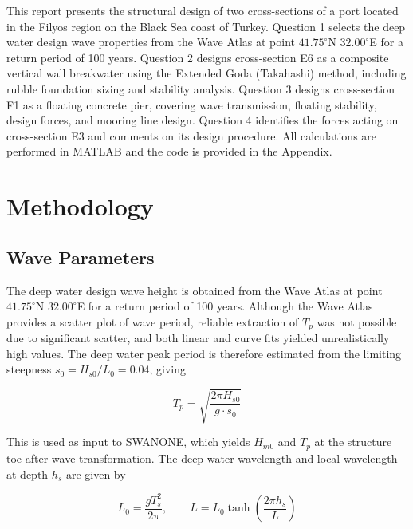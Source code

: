 \documentclass[a4paper, 11pt]{article}
\begin{document}
\hspace*{0.5cm}This report presents the structural design of two cross-sections of a port located in the Filyos region on the Black Sea coast of Turkey. Question 1 selects the deep water design wave properties from the Wave Atlas at point $41.75^{\circ}$N $32.00^{\circ}$E for a return period of 100 years. Question 2 designs cross-section E6 as a composite vertical wall breakwater using the Extended Goda (Takahashi) method, including rubble foundation sizing and stability analysis. Question 3 designs cross-section F1 as a floating concrete pier, covering wave transmission, floating stability, design forces, and mooring line design. Question 4 identifies the forces acting on cross-section E3 and comments on its design procedure. All calculations are performed in MATLAB and the code is provided in the Appendix.

\section{Methodology}

\subsection{Wave Parameters}

\hspace*{0.5cm} The deep water design wave height is obtained from the Wave Atlas at point $41.75^{\circ}$N $32.00^{\circ}$E for a return period of 100 years. Although the Wave Atlas provides a scatter plot of wave period, reliable extraction of $T_p$ was not possible due to significant scatter, and both linear and curve fits yielded unrealistically high values. The deep water peak period is therefore estimated from the limiting steepness $s_0 = H_{s0}/L_0 = 0.04$, giving

\begin{equation}
    T_p = \sqrt{\frac{2\pi H_{s0}}{g \cdot s_0}}
\end{equation}

This is used as input to SWANONE, which yields $H_{m0}$ and $T_p$ at the structure toe after wave transformation. The deep water wavelength and local wavelength at depth $h_s$ are given by

\begin{equation}
    L_0 = \frac{gT_s^2}{2\pi}, \qquad L = L_0 \tanh\left(\frac{2\pi h_s}{L}\right)
\end{equation}
\end{document}
